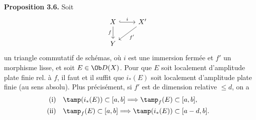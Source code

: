 \textbf{Proposition 3.6.} Soit
\[
\begin{tikzcd}
X \arrow[r,hook,"i"] \arrow[d,"f"'] & X' \arrow[dl,"f'"]\\
Y &
\end{tikzcd}
\]
un triangle commutatif de schémas, où \(i\) est une immersion fermée et \(f'\) un morphisme lisse, et soit \(E\in\Ob D(X)\). Pour que \(E\) soit localement d'amplitude plate finie rel. à \(f\), il faut et il suffit que \(i_*(E)\) soit localement d'amplitude plate finie (au sens absolu). Plus précisément, si \(f'\) est de dimension relative \(\leq d\), on a
\begin{align*}
\text{(i)}\quad &\tamp(i_*(E))\subset[a,b] \Longrightarrow \tamp_f(E)\subset[a,b],\\
\text{(ii)}\quad &\tamp_f(E)\subset[a,b] \Longrightarrow \tamp(i_*(E))\subset[a-d,b].
\end{align*}

